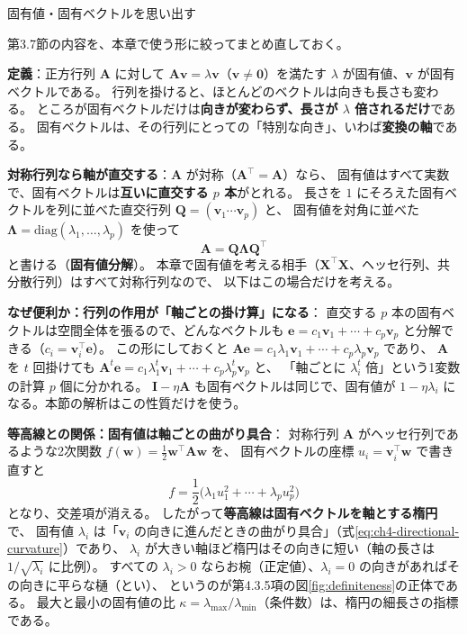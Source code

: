 \begin{mlcolumn}{固有値・固有ベクトルを思い出す}

第3.7節の内容を、本章で使う形に絞ってまとめ直しておく。

\textbf{定義}：正方行列 $\bm{A}$ に対して $\bm{A}\bm{v} = \lambda\bm{v}$（$\bm{v} \neq \bm{0}$）を満たす
$\lambda$ が固有値、$\bm{v}$ が固有ベクトルである。
行列を掛けると、ほとんどのベクトルは向きも長さも変わる。
ところが固有ベクトルだけは\textbf{向きが変わらず、長さが $\lambda$ 倍されるだけ}である。
固有ベクトルは、その行列にとっての「特別な向き」、いわば\textbf{変換の軸}である。

\textbf{対称行列なら軸が直交する}：$\bm{A}$ が対称（$\bm{A}^\top = \bm{A}$）なら、
固有値はすべて実数で、固有ベクトルは\textbf{互いに直交する $p$ 本}がとれる。
長さを $1$ にそろえた固有ベクトルを列に並べた直交行列 $\bm{Q} = (\bm{v}_1 \cdots \bm{v}_p)$ と、
固有値を対角に並べた $\bm{\Lambda} = \mathrm{diag}(\lambda_1, \ldots, \lambda_p)$ を使って
\begin{equation*}
  \bm{A} = \bm{Q}\bm{\Lambda}\bm{Q}^\top
\end{equation*}
と書ける（\textbf{固有値分解}）。
本章で固有値を考える相手（$\bm{X}^\top\bm{X}$、ヘッセ行列、共分散行列）はすべて対称行列なので、
以下はこの場合だけを考える。

\textbf{なぜ便利か：行列の作用が「軸ごとの掛け算」になる}：
直交する $p$ 本の固有ベクトルは空間全体を張るので、どんなベクトルも
$\bm{e} = c_1\bm{v}_1 + \cdots + c_p\bm{v}_p$ と分解できる（$c_i = \bm{v}_i^\top\bm{e}$）。
この形にしておくと $\bm{A}\bm{e} = c_1\lambda_1\bm{v}_1 + \cdots + c_p\lambda_p\bm{v}_p$ であり、
$\bm{A}$ を $t$ 回掛けても $\bm{A}^t\bm{e} = c_1\lambda_1^t\bm{v}_1 + \cdots + c_p\lambda_p^t\bm{v}_p$ と、
「軸ごとに $\lambda_i^t$ 倍」という1変数の計算 $p$ 個に分かれる。
$\bm{I} - \eta\bm{A}$ も固有ベクトルは同じで、固有値が $1 - \eta\lambda_i$ になる。本節の解析はこの性質だけを使う。

\textbf{等高線との関係：固有値は軸ごとの曲がり具合}：
対称行列 $\bm{A}$ がヘッセ行列であるような2次関数 $f(\bm{w}) = \frac{1}{2}\bm{w}^\top\bm{A}\bm{w}$ を、
固有ベクトルの座標 $u_i = \bm{v}_i^\top\bm{w}$ で書き直すと
\begin{equation*}
  f = \frac{1}{2}\bigl(\lambda_1 u_1^2 + \cdots + \lambda_p u_p^2\bigr)
\end{equation*}
となり、交差項が消える。
したがって\textbf{等高線は固有ベクトルを軸とする楕円}で、
固有値 $\lambda_i$ は「$\bm{v}_i$ の向きに進んだときの曲がり具合」（式\eqref{eq:ch4-directional-curvature}）であり、
$\lambda_i$ が大きい軸ほど楕円はその向きに短い（軸の長さは $1/\sqrt{\lambda_i}$ に比例）。
すべての $\lambda_i > 0$ ならお椀（正定値）、$\lambda_i = 0$ の向きがあればその向きに平らな樋（とい）、
というのが第4.3.5項の図\ref{fig:definiteness}の正体である。
最大と最小の固有値の比 $\kappa = \lambda_{\max}/\lambda_{\min}$（条件数）は、楕円の細長さの指標である。


\end{mlcolumn}

